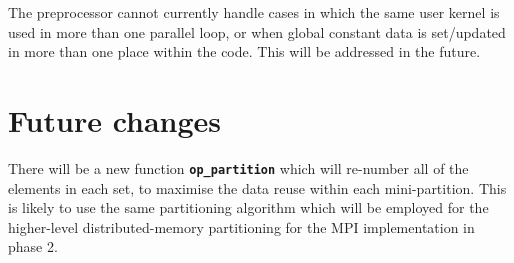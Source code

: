 The preprocessor cannot currently handle cases in which the same user kernel is 
used in more than one parallel loop, or when global constant data is set/updated 
in more than one place within the code.  This will be addressed in the future.


\section{Future changes}

There will be a new function {\tt \bf op\_partition} which will re-number 
all of the elements in each set, to maximise the data reuse within each 
mini-partition.  This is likely to use the same partitioning algorithm which
will be employed for the higher-level distributed-memory partitioning for the
MPI implementation in phase 2.






